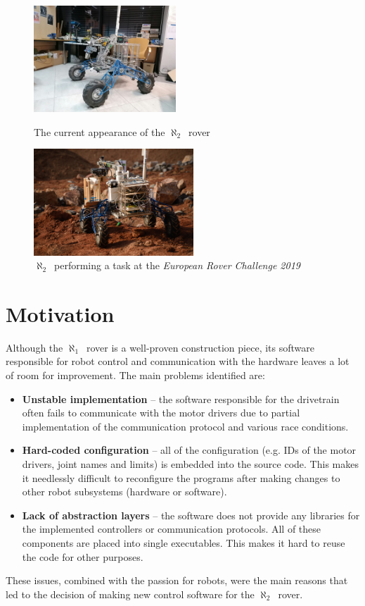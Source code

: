 \documentclass[english,inz,shortabstract]{iithesis}
\newcommand{\oldrovername}{$\aleph_1$\ }
\newcommand{\rovername}{$\aleph_2$\ }
\begin{document}
\begin{figure}[ht]
	\hspace*{\fill}
	\begin{minipage}{.45\textwidth}
	  \centering
	  \includegraphics[height=4cm]{img/lazik1.jpg}
	  \caption{The current appearance of the \rovername rover}
	  \label{fig:lazik1}
	\end{minipage}
	\hfill
	\begin{minipage}{.45\textwidth}
	  \centering
	  \includegraphics[height=4cm]{img/lazik2.jpg}
	  \caption{\rovername performing a task at the \textit{European Rover Challenge 2019}}
	  \label{fig:lazik2}
	\end{minipage}
	\hspace*{\fill}
\end{figure}

\section{Motivation}
Although the \oldrovername rover is a well-proven construction piece, its software responsible for robot control and communication with the hardware leaves a lot of room for improvement. The main problems identified are:
\begin{itemize}
	\item \textbf{Unstable implementation} -- the software responsible for the drivetrain often fails to communicate with the motor drivers due to  partial implementation of the communication protocol and various race conditions.
	\item \textbf{Hard-coded configuration} -- all of the configuration (e.g. IDs of the motor drivers, joint names and limits) is embedded into the source code. This makes it needlessly difficult to reconfigure the programs after making changes to other robot subsystems (hardware or software).
	\item \textbf{Lack of abstraction layers} -- the software does not provide any libraries for the implemented controllers or communication protocols. All of these components are placed into single executables. This makes it hard to reuse the code for other purposes.
\end{itemize}
These issues, combined with the passion for robots, were the main reasons that led to the decision of making new control software for the \rovername rover.
\end{document}
